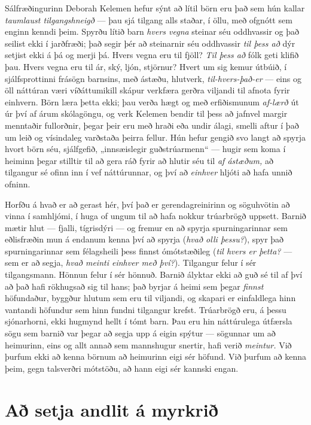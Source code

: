 Sálfræðingurinn Deborah Kelemen hefur sýnt að lítil börn eru það sem hún kallar \emph{taumlaust tilgangshneigð} — þau sjá tilgang alls staðar, í öllu, með ofgnótt sem enginn kenndi þeim. Spyrðu lítið barn \emph{hvers vegna} steinar séu oddhvassir og það seilist ekki í jarðfræði; það segir þér að steinarnir séu oddhvassir \emph{til þess að} dýr setjist ekki á þá og merji þá. Hvers vegna eru til fjöll? \emph{Til þess að} fólk geti klifið þau. Hvers vegna eru til ár, ský, ljón, stjörnur? Hvert um sig kemur útbúið, í sjálfsprottinni frásögn barnsins, með ástæðu, hlutverk, \emph{til-hvers-það-er} — eins og öll náttúran væri víðáttumikill skápur verkfæra gerðra viljandi til afnota fyrir einhvern. Börn læra þetta ekki; þau verða hægt og með erfiðismunum \emph{af-lærð} út úr því af árum skólagöngu, og verk Kelemen bendir til þess að jafnvel margir menntaðir fullorðnir, þegar þeir eru með hraði eða undir álagi, smelli aftur í það um leið og vísindaleg varðstaða þeirra fellur. Hún hefur gengið svo langt að spyrja hvort börn séu, sjálfgefið, „innsæislegir guðstrúarmenn“ — hugir sem koma í heiminn þegar stilltir til að gera ráð fyrir að hlutir séu til \emph{af ástæðum,} að tilgangur sé ofinn inn í vef náttúrunnar, og því að \emph{einhver} hljóti að hafa unnið ofninn.

Horfðu á hvað er að gerast hér, því það er gerendagreinirinn og söguhvötin að vinna í samhljómi, í huga of ungum til að hafa nokkur trúarbrögð uppsett. Barnið mætir hlut — fjalli, tígrisdýri — og fremur en að spyrja spurningarinnar sem eðlisfræðin mun á endanum kenna því að spyrja (\emph{hvað olli þessu?}), spyr það spurningarinnar sem félagsheili þess finnst ómótstæðileg (\emph{til hvers er þetta?} — sem er að segja, \emph{hvað meinti einhver með því?}). Tilgangur felur í sér tilgangsmann. Hönnun felur í sér hönnuð. Barnið ályktar ekki að guð sé til af því að það hafi rökhugsað sig til hans; það byrjar á heimi sem þegar \emph{finnst} höfundaður, byggður hlutum sem eru til viljandi, og skapari er einfaldlega hinn vantandi höfundur sem hinn fundni tilgangur krefst. Trúarbrögð eru, á þessu sjónarhorni, ekki hugmynd hellt í tómt barn. Þau eru hin náttúrulega útfærsla sögu sem barnið var þegar að segja upp á eigin spýtur — sögunnar um að heimurinn, eins og allt annað sem mannshugur snertir, hafi verið \emph{meintur.} Við þurfum ekki að kenna börnum að heimurinn eigi sér höfund. Við þurfum að kenna þeim, gegn talsverðri mótstöðu, að hann eigi sér kannski engan.

\section*{Að setja andlit á myrkrið}

